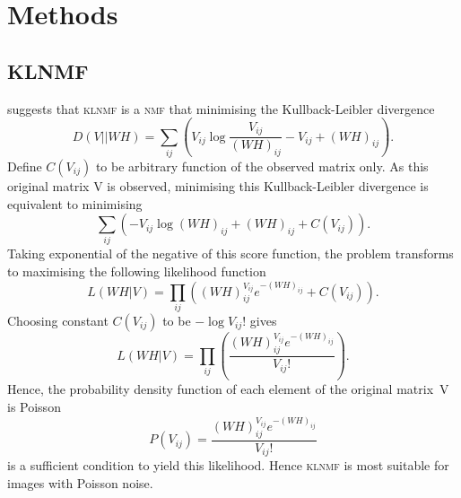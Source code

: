 \section{Methods \label{chapter2}}
\subsection{KLNMF}
\citet{NIPS2000_1861} suggests that \textsc{klnmf} is a \textsc{nmf} that minimising the Kullback-Leibler divergence
\begin{equation*}
  D(V||WH)=\sum_{ij}\left(V_{ij}\log\frac{V_{ij}}{\left(WH\right)_{ij}}-V_{ij}+\left(WH\right)_{ij}\right).
\end{equation*}
Define $C(V_{ij})$ to be arbitrary function of the observed matrix only. As this original matrix V is observed, minimising this Kullback-Leibler divergence is equivalent to minimising
\begin{equation*}
  \sum_{ij}\left(-V_{ij}\log\left(WH\right)_{ij}+\left(WH\right)_{ij}+C(V_{ij})\right).
\end{equation*}
Taking exponential of the negative of this score function, the problem transforms to maximising the following likelihood function
\begin{equation*}
L(WH|V)=\prod_{ij}\left(\left(WH\right)_{ij}^{V_{ij}}e^{-\left(WH\right)_{ij}}+C(V_{ij})\right).
\end{equation*}
Choosing constant $C(V_{ij})$ to be $-\log V_{ij}!$ gives
\begin{equation*}
L(WH|V)=\prod_{ij}\left(\frac{\left(WH\right)_{ij}^{V_{ij}}e^{-\left(WH\right)_{ij}}}{V_{ij}!}\right).
\end{equation*}
Hence, the probability density function of each element of the original matrix~V is Poisson
\begin{equation*}
P(V_{ij})=\frac{\left(WH\right)_{ij}^{V_{ij}}e^{-\left(WH\right)_{ij}}}{V_{ij}!}
\end{equation*}
is a sufficient condition to yield this likelihood. Hence \textsc{klnmf} is most suitable for images with Poisson noise.
